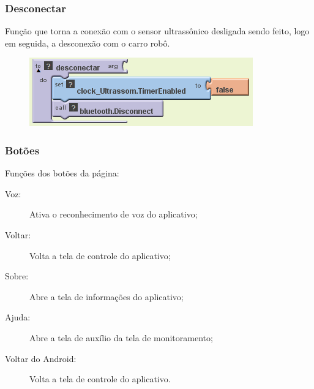 \documentclass[portugues, brazil, a4paper,12pt]{article}
\begin{document}
\subsubsection{Desconectar}
Função que torna a conexão com o sensor ultrassônico desligada sendo feito, logo em seguida, a desconexão com o carro robô.


\begin{figure}[H]
	\centering
	\includegraphics[scale=.8]{img/monitoramento/desconectar.png}
	
\end{figure}

\subsubsection{Botões}
Funções dos botões da página:
\begin{description}
\item [Voz:] Ativa o reconhecimento de voz do aplicativo;
\item [Voltar:] Volta a tela de controle do aplicativo;
\item [Sobre:] Abre a tela de informações do aplicativo;
\item [Ajuda:] Abre a tela de auxílio da tela de monitoramento;
\item [Voltar do Android:] Volta a tela de controle do aplicativo.
\end{description}
\end{document}

